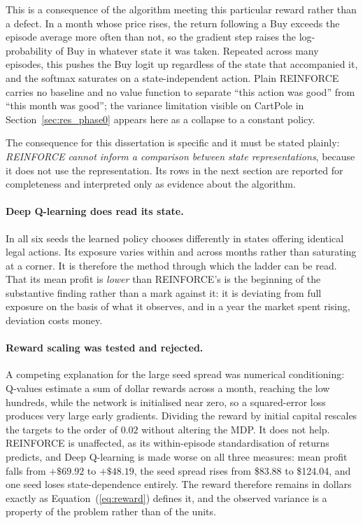 This is a consequence of the algorithm meeting this particular reward
rather than a defect. In a month whose price rises, the return following a
Buy exceeds the episode average more often than not, so the gradient step
raises the log-probability of Buy in whatever state it was taken. Repeated
across many episodes, this pushes the Buy logit up regardless of the state
that accompanied it, and the softmax saturates on a state-independent
action. Plain REINFORCE carries no baseline and no value function to
separate ``this action was good'' from ``this month was good''; the
variance limitation visible on CartPole in Section~\ref{sec:res_phase0}
appears here as a collapse to a constant policy.

The consequence for this dissertation is specific and it must be stated
plainly: \emph{REINFORCE cannot inform a comparison between state
representations}, because it does not use the representation. Its rows in
the next section are reported for completeness and interpreted only as
evidence about the algorithm.

\paragraph{Deep Q-learning does read its state.} In all six seeds the
learned policy chooses differently in states offering identical legal
actions. Its exposure varies within and across months rather than saturating
at a corner. It is therefore the method through which the ladder can be
read. That its mean profit is \emph{lower} than REINFORCE's is
the beginning of the substantive finding rather than a mark against it: it
is deviating from full exposure on the basis of what it observes, and in a
year the market spent rising, deviation costs money.

\paragraph{Reward scaling was tested and rejected.} A competing explanation
for the large seed spread was numerical conditioning: Q-values estimate a
sum of dollar rewards across a month, reaching the low hundreds, while the
network is initialised near zero, so a squared-error loss produces very
large early gradients. Dividing the reward by initial capital rescales the
targets to the order of $0.02$ without altering the MDP. It does not help.
REINFORCE is unaffected, as its within-episode standardisation of returns
predicts, and Deep Q-learning is made worse on all three measures: mean
profit falls from $+\$69.92$ to $+\$48.19$, the seed spread rises from
\$83.88 to \$124.04, and one seed loses state-dependence entirely. The
reward therefore remains in dollars exactly as
Equation~(\ref{eq:reward}) defines it, and the observed variance is a
property of the problem rather than of the units.


